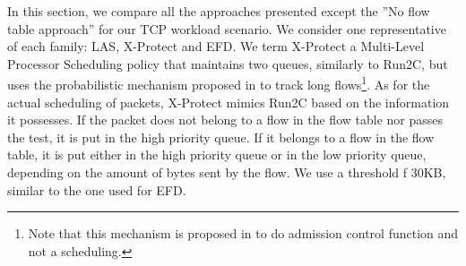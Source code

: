 \documentclass[preprint,12pt]{elsarticle}
\begin{document}
In this section, we compare all the approaches presented except the ''No flow table approach'' for our TCP workload scenario. We consider one representative of each family: LAS, X-Protect and EFD. We term X-Protect a Multi-Level Processor Scheduling policy that maintains two queues, similarly to Run2C, but uses the probabilistic mechanism proposed in \cite{Kortebi04Xprotect} to track long flows\footnote{Note that this mechanism is proposed in \cite{Kortebi04Xprotect} to do admission control function and not a scheduling.}. As for the actual scheduling of packets, X-Protect mimics Run2C based on the information it possesses. If the packet does not belong to a flow in the flow table nor passes the test, it is put in the high priority queue. If it belongs to a flow in the flow table, it is put either in the high priority queue or in the low priority queue, depending on the amount of bytes sent by the flow. We use a threshold f 30KB, similar to the one used for EFD.


\end{document}
